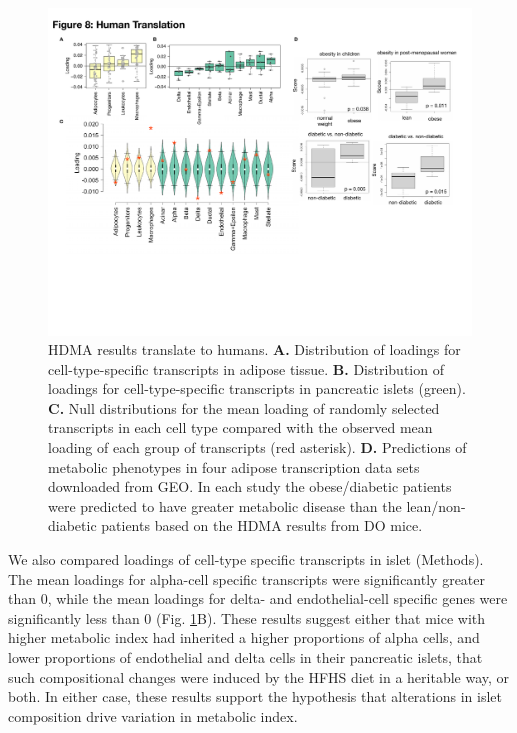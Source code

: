 \documentclass[
]{article}
\begin{document}
\begin{figure}[ht!]
\includegraphics[width=\textwidth]{Figures/Fig8_Human_Translation.pdf} 
\caption{HDMA results translate to humans. \textbf{A.} Distribution of 
loadings for cell-type-specific transcripts in adipose tissue. \textbf{B.} 
Distribution of loadings for cell-type-specific transcripts in pancreatic 
islets (green). \textbf{C.} Null distributions for the mean loading of 
randomly selected transcripts in each cell type compared with the observed 
mean loading of each group of transcripts (red asterisk). \textbf{D.} 
Predictions of metabolic phenotypes in four adipose transcription data 
sets downloaded from GEO. In each study the obese/diabetic patients were 
predicted to have greater metabolic disease than the lean/non-diabetic 
patients based on the HDMA results from DO mice.
}
\label{fig:human_translation}
\end{figure}

We also compared loadings of cell-type specific transcripts in islet
(Methods). The mean loadings for alpha-cell specific transcripts were
significantly greater than 0, while the mean loadings for delta- and
endothelial-cell specific genes were significantly less than 0 (Fig.
\ref{fig:human_translation}B). These results suggest either that mice
with higher metabolic index had inherited a higher proportions of alpha
cells, and lower proportions of endothelial and delta cells in their
pancreatic islets, that such compositional changes were induced by the
HFHS diet in a heritable way, or both. In either case, these results
support the hypothesis that alterations in islet composition drive
variation in metabolic index.
\end{document}

